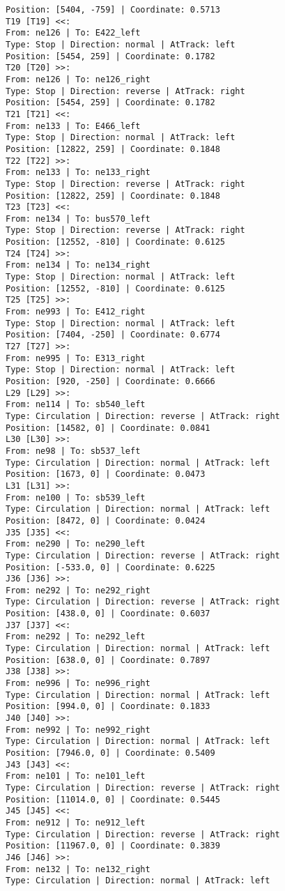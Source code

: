 \begin{lstlisting}[language = {}, tabsize=4, basicstyle=\footnotesize\ttfamily, showspaces=false, showstringspaces=false, caption = Signalling.RNA, label = {lst:EJ4_6}]
Position: [5404, -759] | Coordinate: 0.5713
T19 [T19] <<:
From: ne126 | To: E422_left
Type: Stop | Direction: normal | AtTrack: left 
Position: [5454, 259] | Coordinate: 0.1782
T20 [T20] >>:
From: ne126 | To: ne126_right
Type: Stop | Direction: reverse | AtTrack: right 
Position: [5454, 259] | Coordinate: 0.1782
T21 [T21] <<:
From: ne133 | To: E466_left
Type: Stop | Direction: normal | AtTrack: left 
Position: [12822, 259] | Coordinate: 0.1848
T22 [T22] >>:
From: ne133 | To: ne133_right
Type: Stop | Direction: reverse | AtTrack: right 
Position: [12822, 259] | Coordinate: 0.1848
T23 [T23] <<:
From: ne134 | To: bus570_left
Type: Stop | Direction: reverse | AtTrack: right 
Position: [12552, -810] | Coordinate: 0.6125
T24 [T24] >>:
From: ne134 | To: ne134_right
Type: Stop | Direction: normal | AtTrack: left 
Position: [12552, -810] | Coordinate: 0.6125
T25 [T25] >>:
From: ne993 | To: E412_right
Type: Stop | Direction: normal | AtTrack: left 
Position: [7404, -250] | Coordinate: 0.6774
T27 [T27] >>:
From: ne995 | To: E313_right
Type: Stop | Direction: normal | AtTrack: left 
Position: [920, -250] | Coordinate: 0.6666
L29 [L29] >>:
From: ne114 | To: sb540_left
Type: Circulation | Direction: reverse | AtTrack: right 
Position: [14582, 0] | Coordinate: 0.0841
L30 [L30] >>:
From: ne98 | To: sb537_left
Type: Circulation | Direction: normal | AtTrack: left 
Position: [1673, 0] | Coordinate: 0.0473
L31 [L31] >>:
From: ne100 | To: sb539_left
Type: Circulation | Direction: normal | AtTrack: left 
Position: [8472, 0] | Coordinate: 0.0424
J35 [J35] <<:
From: ne290 | To: ne290_left
Type: Circulation | Direction: reverse | AtTrack: right 
Position: [-533.0, 0] | Coordinate: 0.6225
J36 [J36] >>:
From: ne292 | To: ne292_right
Type: Circulation | Direction: reverse | AtTrack: right 
Position: [438.0, 0] | Coordinate: 0.6037
J37 [J37] <<:
From: ne292 | To: ne292_left
Type: Circulation | Direction: normal | AtTrack: left 
Position: [638.0, 0] | Coordinate: 0.7897
J38 [J38] >>:
From: ne996 | To: ne996_right
Type: Circulation | Direction: normal | AtTrack: left 
Position: [994.0, 0] | Coordinate: 0.1833
J40 [J40] >>:
From: ne992 | To: ne992_right
Type: Circulation | Direction: normal | AtTrack: left 
Position: [7946.0, 0] | Coordinate: 0.5409
J43 [J43] <<:
From: ne101 | To: ne101_left
Type: Circulation | Direction: reverse | AtTrack: right 
Position: [11014.0, 0] | Coordinate: 0.5445
J45 [J45] <<:
From: ne912 | To: ne912_left
Type: Circulation | Direction: reverse | AtTrack: right 
Position: [11967.0, 0] | Coordinate: 0.3839
J46 [J46] >>:
From: ne132 | To: ne132_right
Type: Circulation | Direction: normal | AtTrack: left 

\end{lstlisting}
